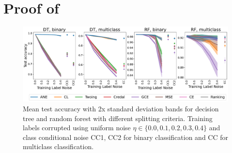 \documentclass[letterpaper]{article} %
\begin{document}
\section{Proof of }
\label{app:NE-loss}
\negexp*

\begin{figure}[t]
    \centering
    \includegraphics[width=14cm]{figs/cifar10_pretrained_scaled.pdf}
    \caption{Mean test accuracy with 2x standard deviation bands for decision tree and random forest with different splitting criteria.
    Training labels corrupted using uniform noise $\eta\in\{0.0,0.1,0.2,0.3,0.4\}$ and class conditional noise CC1, CC2 for binary classification and CC for multiclass classification.
    }
    \label{fig:pre_trained}
\end{figure}
\end{document}
